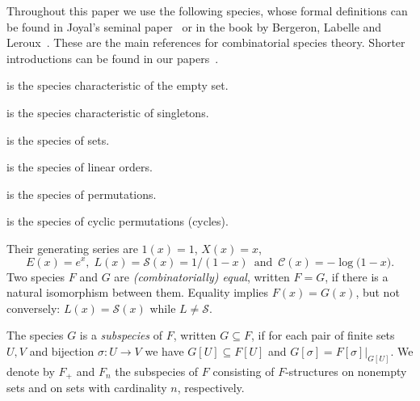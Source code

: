 \documentclass[a4paper,11pt,UKenglish]{article}
\newcommand{\Set}{E}
\newcommand{\Lin}{L}
\newcommand{\Sym}{\mathcal{S}}
\newcommand{\Cyc}{\mathcal{C}}
\theoremstyle{definition}
\begin{document}
Throughout this paper we use the following species, whose formal
definitions can be found in Joyal's seminal paper~\cite{J} or in
the book by Bergeron, Labelle and Leroux~\cite{BLL}. These are the main references
for combinatorial species theory. Shorter introductions
can be found in our papers~\cite{CCcaypol2,CCEG,Cl}.
\begin{description}[labelindent=2em]
\item[$1=\Set_0$] is the species characteristic of the empty set.
\item[$X=\Set_1$] is the species characteristic of singletons.
\item[$\Set$] is the species of sets.
\item[$\Lin$] is the species of linear orders.
\item[$\Sym$] is the species of permutations.
\item[$\Cyc$] is the species of cyclic permutations (cycles).
\end{description}
%
Their generating series are
$1(x)=1$, $X(x)=x$,
\[
  \Set(x)=e^x,\;
  \Lin(x)=\Sym(x)=1/(1-x)\,\text{ and }\,
  \Cyc(x)=-\log\bigl(1-x\bigr).
\]
Two species $F$ and $G$ are \emph{(combinatorially) equal}, written
$F=G$, if there is a natural isomorphism between them.  Equality implies
$F(x)=G(x)$, but not conversely: $\Lin(x)=\Sym(x)$ while $\Lin\neq \Sym$.


The species $G$ is a \emph{subspecies} of $F$, written $G\subseteq F$,
if for each pair of finite sets $U,V$ and bijection $\sigma:U\to V$ we have
$G[U]\subseteq F[U]$ and $G[\sigma]=F[\sigma]|_{G[U]}$.
We denote by $F_+$ and $F_n$ the subspecies of $F$ consisting of
$F$-structures on nonempty sets and on sets with cardinality $n$,
respectively.
\end{document}
